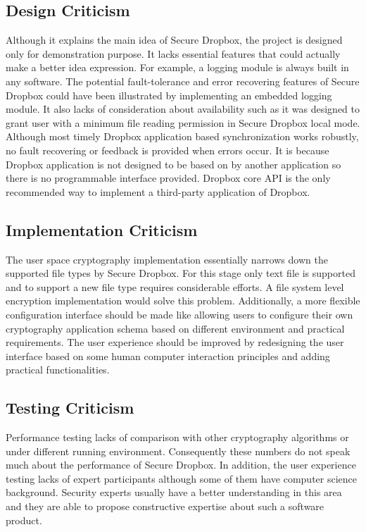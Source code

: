 \subsection{Design Criticism}

Although it explains the main idea of Secure Dropbox, the project is designed only for demonstration purpose. It lacks essential features that could actually make a better idea expression. For example, a logging module is always built in any software. The potential fault-tolerance and error recovering features of Secure Dropbox could have been illustrated by implementing an embedded logging module. It also lacks of consideration about availability such as it was designed to grant user with a minimum file reading permission in Secure Dropbox local mode. Although most timely Dropbox application based synchronization works robustly, no fault recovering or feedback is provided when errors occur. It is because Dropbox application is not designed to be based on by another application so there is no programmable interface provided. Dropbox core API is the only recommended way to implement a third-party application of Dropbox.

\subsection{Implementation Criticism}

The user space cryptography implementation essentially narrows down the supported file types by Secure Dropbox. For this stage only text file is supported and to support a new file type requires considerable efforts. A file system level encryption implementation would solve this problem. Additionally, a more flexible configuration interface should be made like allowing users to configure their own cryptography application schema based on different environment and practical requirements. The user experience should be improved by redesigning the user interface based on some human computer interaction principles and adding practical functionalities. 

\subsection{Testing  Criticism}

Performance testing lacks of comparison with other cryptography algorithms or under different running environment. Consequently these numbers do not speak much about the performance of Secure Dropbox. In addition, the user experience testing lacks of expert participants although some of them have computer science background. Security experts usually have a better understanding in this area and they are able to propose constructive expertise about such a software product.

